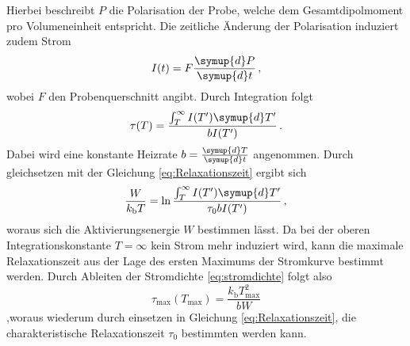 Hierbei beschreibt $P$ die Polarisation der Probe, welche dem Gesamtdipolmoment pro Volumeneinheit entspricht.
Die zeitliche Änderung der Polarisation induziert zudem Strom
\begin{equation}
    I(t) = F\frac{\symup{d}P}{\symup{d}t} \, ,
\end{equation}
wobei $F$ den Probenquerschnitt angibt.
Durch Integration folgt 
\begin{equation}
    \tau(T) = \frac{ \int_{T}^{\infty} I(T')\symup{d}T'}{bI(T')} \, .
\end{equation}
Dabei wird eine konstante Heizrate $b = \frac{\symup{d}T}{\symup{d}t}$ angenommen.
Durch gleichsetzen mit der Gleichung \eqref{eq:Relaxationszeit} ergibt sich
\begin{equation}
    \frac{W}{k_\text{b}T} = \ln \frac{ \int_{T}^{\infty} I(T')\symup{d}T'}{\tau_0 b I(T')} \, ,
    \label{eq:int}
\end{equation}
woraus sich die Aktivierungsenergie $W$ bestimmen lässt.
Da bei der oberen Integrationskonstante $T=\infty$ kein Strom mehr induziert wird, kann die maximale Relaxationszeit aus der Lage des ersten Maximums der Stromkurve bestimmt werden.
Durch Ableiten der Stromdichte \eqref{eq:stromdichte} folgt also
\begin{equation}
    \tau _\text{max}(T_\text{max}) = \frac{k_\text{b} T_\text{max} ^2}{bW}
    \label{eq:t_max}
\end{equation}
,woraus wiederum durch einsetzen in Gleichung \eqref{eq:Relaxationszeit}, die charakteristische Relaxationszeit $\tau_0$ bestimmten werden kann.


